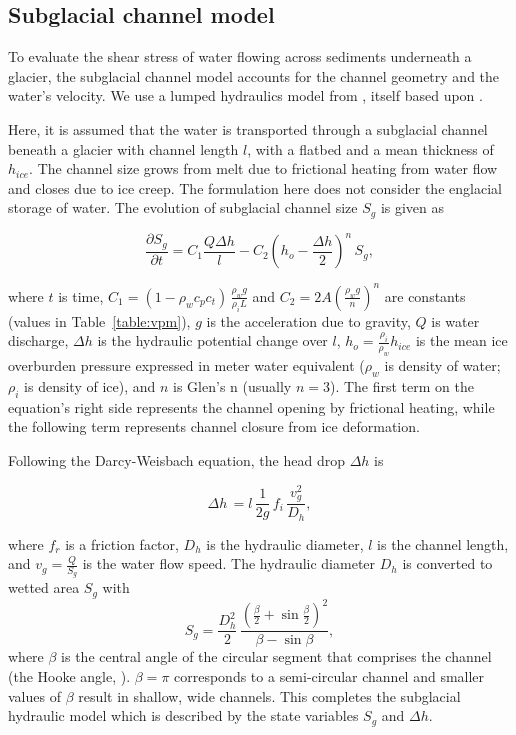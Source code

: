 \documentclass[esurf, manuscript]{copernicus}
\begin{document}
\subsection{Subglacial channel  model}
\label{sect:sub_mode}

To evaluate the shear stress of water flowing across sediments underneath a glacier, the subglacial channel model accounts for the channel geometry and the water's velocity.
We use a lumped hydraulics model from \citet{werder2010b}, itself based upon  \citet{clarke1996}.

Here, it is assumed that the water is transported through a subglacial channel \citep[Figure~\ref{fig:cartoon}; ][]{rothlisberger1972} beneath a glacier with channel length $l$, with a flatbed and a mean thickness of $h_{ice}$.
The channel size grows from melt due to frictional heating from water flow and closes due to ice creep.
The formulation here does not consider the englacial storage of water.
The evolution of subglacial channel size $S_g$ is given as
\begin{linenomath*}
  \begin{equation}
    \label{eq:dS_dt}
    \frac{\partial S_g}{\partial t} = C_1 \frac{Q \Delta h}{l} - C_2 \left(h_{o}-\frac{\Delta h}{2}\right)^n\,S_g,
  \end{equation}
\end{linenomath*}
\noindent where $t$ is time, $C_1= (1-\rho_wc_pc_t)\,\frac{\rho_wg}{\rho_iL}$ and $C_2=2A(\frac{\rho_wg}{n})^n$ are constants (values in Table~\ref{table:vpm}), $g$ is the acceleration due to gravity, $Q$ is water discharge, $\Delta h$ is the hydraulic potential change over $l$, $h_{o}= \frac{\rho_i}{\rho_w} h_{ice}$ is the mean ice overburden pressure expressed in meter water equivalent ($\rho_w$ is density of water; $\rho_i$ is density of ice), and $n$ is Glen's n \citep{glen1955} (usually $n=3$).
The first term on the equation's right side represents the channel opening by frictional heating, while the following term represents channel closure from ice deformation.


Following the Darcy-Weisbach equation, the head drop $\Delta h$ is
\begin{linenomath*}
  \begin{equation}
    \label{eq:dh}
    \Delta h \,  = l \,\frac{1}{2g} \,f_i\,\frac{v_{g}^{2}}{D_h},
  \end{equation}
\end{linenomath*}
\noindent where $f_r$ is a friction factor, $D_h$ is the hydraulic diameter, $l$ is the channel length, and $v_g=\frac{Q}{S_g}$ is the water flow speed.
% 
The hydraulic diameter $D_h$ is converted to wetted area $S_g$ with
\begin{equation}
  \label{eq:Dh2S}
  S_g= \frac{D_h^2}{2}\,\frac{(\frac{\beta}{2}+\sin \frac{\beta}{2})^2}{\beta - \sin \beta},
\end{equation}
where $\beta$ is the central angle of the circular segment that comprises the channel (the Hooke angle, \citet{hooke1990}). $\beta =\pi$ corresponds to a semi-circular channel and smaller values of $\beta$ result in shallow, wide channels.
This completes the subglacial hydraulic model which is described by the state variables $S_g$ and $\Delta h$.
\end{document}
